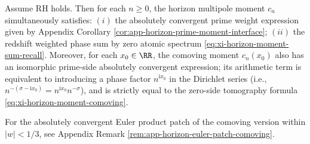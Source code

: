 \begin{corollary}\label{cor:xi-horizon-weighted-explicit-formula}
Assume RH holds.
Then for each \(n\ge 0\), the horizon multipole moment \(c_n\) simultaneously satisfies: \((i)\) the absolutely convergent prime weight expression given by Appendix Corollary \ref{cor:app-horizon-prime-moment-interface}; \((ii)\) the redshift weighted phase sum by zero atomic spectrum \eqref{eq:xi-horizon-moment-sum-recall}.
Moreover, for each \(x_0\in\RR\), the comoving moment \(c_n(x_0)\) also has an isomorphic prime-side absolutely convergent expression; its arithmetic term is equivalent to introducing a phase factor \(n^{\mathrm{i}x_0}\) in the Dirichlet series (i.e., \(n^{-(\sigma-\mathrm{i}x_0)}=n^{\mathrm{i}x_0}n^{-\sigma}\)), and is strictly equal to the zero-side tomography formula \eqref{eq:xi-horizon-moment-comoving}.
\end{corollary}
\noindent
For the absolutely convergent Euler product patch of the comoving version within \(|w|<1/3\), see Appendix Remark \ref{rem:app-horizon-euler-patch-comoving}.

\endinput
